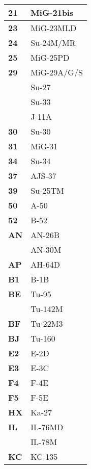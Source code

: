 \documentclass[8pt,usenames,dvipsnames,twoside]{article}
\begin{document}
\begin{multicols*}{2}
\begin{center}
\begin{tabular}{l | p{4cm} }
				\midrule
			\end{tabular}
		\end{center}
		\begin{center}
			\begin{tabular}{l | p{4cm}}
				\textbf{21} & MiG-21bis \\
				\midrule
				\textbf{23} & MiG-23MLD \\
				\midrule
				\textbf{24} & Su-24M/MR \\
				\midrule
				\textbf{25} & MiG-25PD \\
				\midrule
				\textbf{29} & MiG-29A/G/S \\
				& Su-27 \\
				& Su-33 \\
				& J-11A \\
				\midrule
				\textbf{30} & Su-30 \\
				\midrule
				\textbf{31} & MiG-31 \\
				\midrule
				\textbf{34} & Su-34 \\
				\midrule
				\textbf{37} & AJS-37 \\
				\midrule
				\textbf{39} & Su-25TM \\
				\midrule
				\textbf{50} & A-50 \\
				\midrule
				\textbf{52} & B-52 \\
				\midrule
				\textbf{AN} & AN-26B \\
				& AN-30M \\
				\midrule
				\textbf{AP} & AH-64D \\
				\midrule
				\textbf{B1} & B-1B \\
				\midrule
				\textbf{BE} & Tu-95 \\
				& Tu-142M \\
				\midrule
				\textbf{BF} & Tu-22M3 \\
				\midrule
				\textbf{BJ} & Tu-160 \\
				\midrule
				\textbf{E2} & E-2D \\
				\midrule
				\textbf{E3} & E-3C \\
				\midrule
				\textbf{F4} & F-4E \\
				\midrule
				\textbf{F5} & F-5E \\
				\midrule
				\textbf{HX} & Ka-27 \\
				\midrule
				\textbf{IL} & IL-76MD \\
				& IL-78M \\
				\midrule
				\textbf{KC} & KC-135 \\
				\midrule
				

\end{tabular}
\end{center}
\end{multicols*}
\end{document}
